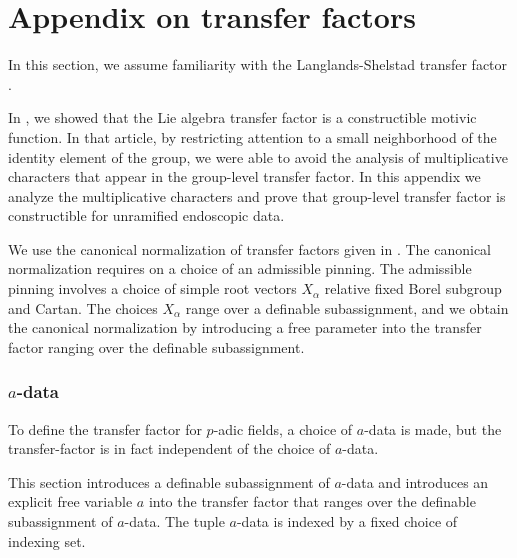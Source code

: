 \section{Appendix on transfer factors}

In this section, we assume familiarity with the Langlands-Shelstad
transfer factor \cite{langlands1987definition}.

In \cite{gordon}, we showed that the Lie algebra transfer factor is a
constructible motivic function.  In that article, by restricting
attention to a small neighborhood of the identity element of the
group, we were able to avoid the analysis of multiplicative characters
that appear in the group-level transfer factor.  In this appendix we
analyze the multiplicative characters and prove that group-level
transfer factor is constructible for unramified endoscopic data.

We use the canonical normalization of transfer factors given in
\cite[\S7]{hales1993simple}.  The canonical normalization requires on
a choice of an admissible pinning.  The admissible pinning involves a
choice of simple root vectors $X_\alpha$ relative fixed Borel subgroup
and Cartan.  The choices $X_\alpha$ range over a definable
subassignment, and we obtain the canonical normalization by
introducing a free parameter into the transfer factor ranging over the
definable subassignment.

\subsubsection{$a$-data}

To define the transfer factor for $p$-adic fields, a choice of
$a$-data is made, but the transfer-factor is in fact independent of
the choice of $a$-data.

This section introduces a definable subassignment of $a$-data and
introduces an explicit free variable $a$ into the transfer factor that
ranges over the definable subassignment of $a$-data.  The tuple
$a$-data is indexed by a fixed choice of indexing set.

